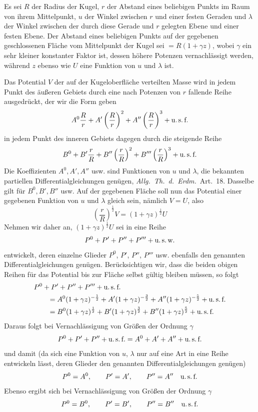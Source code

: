 Es sei $R$ der Radius der Kugel, $r$ der Abstand eines beliebigen Punkts im Raum von ihrem Mittelpunkt, $u$ der Winkel zwischen $r$ und einer festen Geraden und $\lambda$ der Winkel zwischen der durch diese Gerade und $r$ gelegten Ebene und einer festen Ebene. Der Abstand eines beliebigen Punkts auf der gegebenen geschlossenen Fläche vom Mittelpunkt der Kugel sei $=R(1+\gamma z)$, wobei $\gamma$ ein sehr kleiner konstanter Faktor ist, dessen höhere Potenzen vernachlässigt werden, während $z$ ebenso wie $U$ eine Funktion von $u$ und $\lambda$ ist.

Das Potential $V$ der auf der Kugeloberfläche verteilten Masse wird in jedem Punkt des äußeren Gebiets durch eine nach Potenzen von $r$ fallende Reihe ausgedrückt, der wir die Form geben
\[
A^0\frac Rr+A'\left(\frac Rr\right)^2+A''\left(\frac Rr\right)^3+\text{u.\,s.\,f.}
\]
in jedem Punkt des inneren Gebiets dagegen durch die steigende Reihe
\[
B^0+B'\frac rR+B''\left(\frac rR\right)^2+B'''\left(\frac rR\right)^3+\text{u.\,s.\,f.}
\]
Die Koeffizienten $A^0,A',A''$ usw. sind Funktionen von $u$ und $\lambda$, die bekannten partiellen Differentialgleichungen genügen, \textit{Allg.\ Th.\ d.\ Erdm.}\ Art.\ 18. Dasselbe gilt für $B^0,B',B''$ usw. Auf der gegebenen Fläche soll nun das Potential einer gegebenen Funktion von $u$ und $\lambda$ gleich sein, nämlich $V=U$, also
\[
\left(\frac rR\right)^{\frac12}V=(1+\gamma z)^{\frac12}U
\]
Nehmen wir daher an, $(1+\gamma z)^{\frac12}U$ sei in eine Reihe
\[
P^0+P'+P''+P'''+\text{u.\,s.\,w.}
\]
entwickelt, deren einzelne Glieder $P^0$, $P'$, $P''$, $P'''$ usw. ebenfalls den genannten Differentialgleichungen genügen. Berücksichtigen wir, dass die beiden obigen Reihen für das Potential bis zur Fläche selbst gültig bleiben müssen, so folgt
\[
\begin{aligned}
&P^0+P'+P''+P'''+\text{u.\,s.\,f.}\\
&\qquad=A^0(1+\gamma z)^{-\frac12}+A'(1+\gamma z)^{-\frac32}+A''(1+\gamma z)^{-\frac52}+\text{u.\,s.\,f.}\\
&\qquad=B^0(1+\gamma z)^{\frac12}+B'(1+\gamma z)^{\frac32}+B''(1+\gamma z)^{\frac52}+\text{u.\,s.\,f.}
\end{aligned}
\]
Daraus folgt bei Vernachlässigung von Größen der Ordnung $\gamma$
\[
P^0+P'+P''+\text{u.\,s.\,f.}=A^0+A'+A''+\text{u.\,s.\,f.}
\]
und damit (da sich eine Funktion von $u$, $\lambda$ nur auf eine Art in eine Reihe entwickeln lässt, deren Glieder den genannten Differentialgleichungen genügen)
\[
P^0=A^0,\qquad P'=A',\qquad P''=A''\quad\text{u.\,s.\,f.}
\]
Ebenso ergibt sich bei Vernachlässigung von Größen der Ordnung $\gamma$
\[
P^0=B^0,\qquad P'=B',\qquad P''=B''\quad\text{u.\,s.\,f.}
\]

